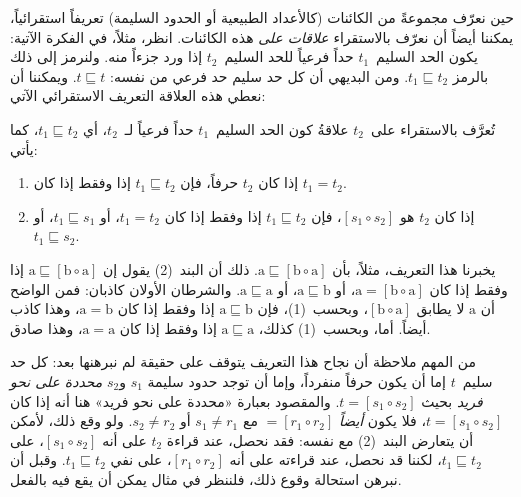 \documentclass[../../../include/open-logic-section]{subfiles}
\begin{document}


حين نعرّف مجموعةً من الكائنات (كالأعداد الطبيعية أو الحدود السليمة)
تعريفاً استقرائياً، يمكننا أيضاً أن نعرّف بالاستقراء \emph{علاقات على}
هذه الكائنات. انظر، مثلاً، في الفكرة الآتية: يكون الحد السليم~$t_1$
حداً فرعياً للحد السليم~$t_2$ إذا ورد جزءاً منه. ولنرمز إلى ذلك بالرمز
$t_1 \sqsubseteq t_2$. ومن البديهي أن كل حد سليم حد فرعي من نفسه:
$t \sqsubseteq t$. ويمكننا أن نعطي هذه العلاقة التعريف الاستقرائي الآتي:

\begin{defn}
  تُعرَّف بالاستقراء على~$t_2$ علاقةُ كون الحد السليم~$t_1$ حداً فرعياً
  لـ~$t_2$، أي $t_1 \sqsubseteq t_2$، كما يأتي:
  \begin{enumerate}
  \item إذا كان $t_2$ حرفاً، فإن $t_1 \sqsubseteq t_2$ إذا وفقط إذا كان
    $t_1 = t_2$.
  \item إذا كان $t_2$ هو $[s_1 \circ s_2]$، فإن
    $t_1 \sqsubseteq t_2$ إذا وفقط إذا كان $t_1 = t_2$، أو
    $t_1 \sqsubseteq s_1$، أو $t_1 \sqsubseteq s_2$.
  \end{enumerate}
\end{defn}

يخبرنا هذا التعريف، مثلاً، بأن $
\mathrm{a} \sqsubseteq [\mathrm{b} \circ \mathrm{a}]$. ذلك أن البند~(2)
يقول إن $
\mathrm{a} \sqsubseteq [\mathrm{b} \circ \mathrm{a}]$ إذا وفقط إذا كان
$\mathrm{a} = [\mathrm{b} \circ \mathrm{a}]$، أو
$\mathrm{a} \sqsubseteq \mathrm{b}$، أو
$\mathrm{a} \sqsubseteq \mathrm{a}$. والشرطان الأولان كاذبان: فمن الواضح
أن $\mathrm{a}$ لا يطابق $[\mathrm{b} \circ \mathrm{a}]$، وبحسب~(1)،
فإن $\mathrm{a} \sqsubseteq \mathrm{b}$ إذا وفقط إذا كان
$\mathrm{a} = \mathrm{b}$، وهذا كاذب أيضاً. أما، وبحسب~(1) كذلك،
$\mathrm{a} \sqsubseteq \mathrm{a}$ إذا وفقط إذا كان
$\mathrm{a} = \mathrm{a}$، وهذا صادق.

من المهم ملاحظة أن نجاح هذا التعريف يتوقف على حقيقة لم نبرهنها بعد:
كل حد سليم~$t$ إما أن يكون حرفاً منفرداً، وإما أن توجد حدود سليمة
$s_1$ و$s_2$ \emph{محددة على نحو فريد} بحيث
$t = [s_1 \circ s_2]$. والمقصود بعبارة «محددة على نحو فريد» هنا أنه إذا
كان $t = [s_1 \circ s_2]$، فلا يكون \emph{أيضاً}
$= [r_1 \circ r_2]$ مع $s_1 \neq r_1$ أو $s_2 \neq r_2$.
ولو وقع ذلك، لأمكن أن يتعارض البند~(2) مع نفسه: فقد نحصل، عند قراءة
$t_2$ على أنه $[s_1 \circ s_2]$، على $t_1 \sqsubseteq t_2$، لكننا قد
نحصل، عند قراءته على أنه $[r_1 \circ r_2]$، على نفي
$t_1 \sqsubseteq t_2$. وقبل أن نبرهن استحالة وقوع ذلك، فلننظر في مثال
يمكن أن يقع فيه بالفعل.
\end{document}
